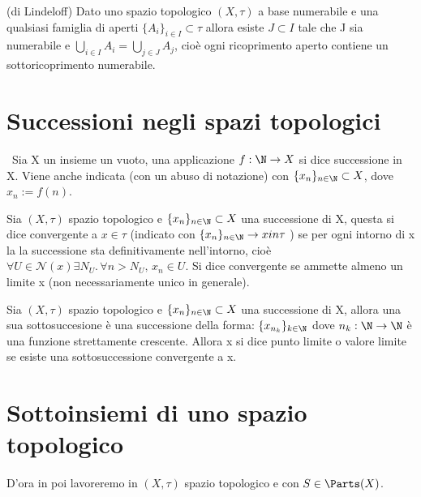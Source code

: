 \documentclass[a4paper]{article}
\begin{document}
\begin{teo}(di Lindeloff) Dato uno spazio topologico $(X , \tau )$ a base numerabile e una qualsiasi famiglia di aperti $\{ A_i \} _{i \in I } \subset \tau $ allora esiste $J \subset I $ tale che J sia numerabile e $\bigcup _{i \in I } A_i =
\bigcup _{j \in J } A_j $, cioè ogni ricoprimento aperto contiene un sottoricoprimento numerabile.
\end{teo}

\section{Successioni negli spazi topologici}

\begin{deff} Sia X un insieme un vuoto, una applicazione $ f: \N \to X$ si dice successione in X. Viene anche indicata (con un abuso di notazione) con $ \{ x_n \}_{n \in \N } \subset X $, dove $ x_n := f(n) $.
\end{deff}

\begin{deff} Sia $(X, \tau )$ spazio topologico e $ \{ x_n \}_{n \in \N } \subset X $ una successione di X, questa si dice convergente a $ x \in \tau $ (indicato con $ \{ x_n \}_{n \in \N } \to x in \tau$ ) se per ogni intorno di x la la successione sta definitivamente nell'intorno, cioè $\forall U \in \mathcal{N}(x) \exists N_U . \, \forall n>N_U , \, x_n \in U $. Si dice convergente se ammette almeno un limite x (non necessariamente unico in generale).
\end{deff}

\begin{deff} Sia $(X, \tau )$ spazio topologico e $ \{ x_n \}_{n \in \N } \subset X $ una successione di X, allora una sua sottosuccesione è una successione della forma: $\{ x_{n_k} \} _{k\in \N }$ dove $n_k : \N \to \N $ è una funzione strettamente crescente. Allora x si dice punto limite o valore limite se esiste una sottosuccessione convergente a x.
\end{deff}

\section{Sottoinsiemi di uno spazio topologico}
D'ora in poi lavoreremo in $(X, \tau )$ spazio topologico e con $S \in \Parts (X) $.
\end{document}
